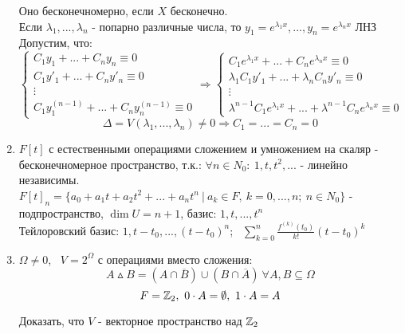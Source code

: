 \begin{enumerate}
    Оно бесконечномерно, если $X$ бесконечно.\\
    Если $\lambda_1, ..., \lambda_n$ - попарно различные числа, то $y_1 = e^{\lambda_1x},..., y_n = e^{\lambda_nx}$ ЛНЗ\\
    Допустим, что:
    $$\begin{cases}
      C_1y_1 + ... + C_ny_n \equiv 0\\
      C_1y'_1 + ... + C_ny'_n \equiv 0\\
      \vdots\\
      C_1y_1^{(n-1)} + ... + C_ny_n^{(n-1)} \equiv 0
    \end{cases} \Longrightarrow \begin{cases}
      C_1e^{\lambda_1x} + ... + C_ne^{\lambda_nx} \equiv 0\\
      \lambda_1C_1y'_1 + ... + \lambda_nC_ny'_n \equiv 0\\
      \vdots\\
      \lambda^{n-1}C_1e^{\lambda_1x} + ... + \lambda^{n-1}C_ne^{\lambda_nx} \equiv 0
    \end{cases}$$
    $$\Delta = V(\lambda_1,...,\lambda_n) \neq 0 \Longrightarrow C_1 = ... = C_n = 0$$
    \item $F[t]$ с естественными операциями сложением и умножением на скаляр - бесконечномерное пространство, т.к.: $\forall n \in N_0: \ 1, t, t^2,...$ - линейно независимы.\\
    $F[t]_n = \{a_0+a_1t+a_2t^2+...+a_nt^n \ | \ a_k\in F, \ k=0,...,n; \ n \in N_0\} $ - подпространство, $\dim U = n+1$, базис: $1,t,...,t^n$\\
    Тейлоровский базис: $1, t-t_0,...,(t-t_0)^n$; \ $\sum \limits_{k=0}^n\frac{f^{(k)}(t_0)}{k!}(t-t_0)^k$ 
    \item $\varOmega \neq 0$, \ $V = 2^\varOmega $ с операциями вместо сложения:
    $$A\vartriangle B = (A\cap \overline{B}) \cup (B\cap \overline{A}) \ \forall A,B \subseteq \varOmega$$
    $$F = \mathbb Z_2,  \ 0\cdot A = \emptyset , \ 1 \cdot A = A$$
    \begin{exercise}
      Доказать, что $V$ - векторное пространство над $\mathbb Z_2$
    \end{exercise}   
  \end{enumerate}
  

